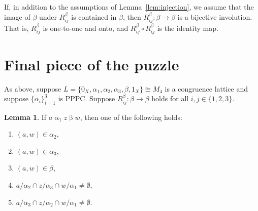 \documentclass{amsart}
\theoremstyle{plain}
\theoremstyle{definition}
\newtheorem{lemma}{Lemma}
\theoremstyle{definition}
\numberwithin{equation}{section}
\newcommand{\<}{\ensuremath{\langle}}
\renewcommand{\>}{\ensuremath{\rangle}}
\renewcommand{\leq}{\ensuremath{\leqslant}}
\newcommand{\ralpha}{\ensuremath{\mathrel{\alpha}}}
\newcommand{\rbeta}{\ensuremath{\mathrel{\beta}}}
\begin{document}
If, in addition to the assumptions  of Lemma~\ref{lem:injection}, we assume that
the image of $\beta$ under $R_{ij}^\beta$ is contained in $\beta$, then 
$R_{ij}^\beta: \beta \rightarrow \beta$ is a bijective involution.
That is, $R_{ij}^\beta$ is one-to-one and onto, and 
$R_{ij}^\beta\circ R_{ij}^\beta$ is the identity map.


\section{Final piece of the puzzle}
As above, suppose $L = \{0_X, \alpha_1, \alpha_2, \alpha_3, \beta, 1_X\} \cong  M_4$ is a
congruence lattice and suppose $\{\alpha_i\}_{i=1}^3$  is \ac{PPPC}.  
Suppose $R_{ij}^\beta: \beta \rightarrow \beta$ holds for all 
$i, j \in \{1,2,3\}$.

\begin{lemma}
  \label{lem:missingpiece}
If %
$a \ralpha_1 z \rbeta w$,
then one of the following holds:
\begin{enumerate}
\item $(a,w) \in \alpha_2$, 
\item $(a,w) \in \alpha_3$, 
\item $(a,w) \in \beta$, 
\item $a/\alpha_2 \cap z/\alpha_3 \cap w/\alpha_1 \neq \emptyset$,
\item $a/\alpha_3 \cap z/\alpha_2 \cap w/\alpha_1 \neq \emptyset$.
\end{enumerate}
\end{lemma}
\end{document}
